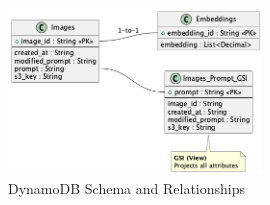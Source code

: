 \documentclass{article}
\begin{document}
\begin{figure}[h!]
    \centering
    \includegraphics[width=0.6\textwidth]{uml/schemas.png} %
    \caption{DynamoDB Schema and Relationships}
    \label{fig:schema}
\end{figure}
\end{document}
